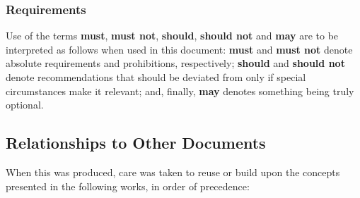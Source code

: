 \subsubsection{Requirements}

Use of the terms \textbf{must}, \textbf{must not}, \textbf{should}, \textbf{should not} and \textbf{may} are to be interpreted as follows when used in this document: \textbf{must} and \textbf{must not} denote absolute requirements and prohibitions, respectively; \textbf{should} and \textbf{should not} denote recommendations that should be deviated from only if special circumstances make it relevant; and, finally, \textbf{may} denotes something being truly optional.

\subsection{Relationships to Other Documents}
\label{sec:introduction:relationships}

When this  was produced, care was taken to reuse or build upon the concepts presented in the following works, in order of precedence:

